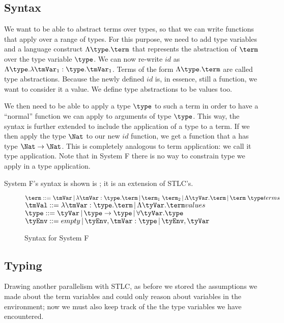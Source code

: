 \subsection{Syntax}
We want to be able to abstract terms over types, so that we can write functions that apply over a range of types. For this purpose, we need to add type variables and a language construct $\Lambda \type.\term$ that represents the abstraction of $\term$ over the type variable $\type$. We can now re-write $id$ as $\Lambda \type. \lambda \tmVar_1: \type . \tmVar_1$. Terms of the form $\Lambda \type.\term$ are called type abstractions. Because the newly defined $id$ is, in essence, still a function, we want to consider it a value. We define type abstractions to be values too.

We then need to be able to apply a type $\type$ to such a term in order to have a ``normal'' function we can apply to arguments of type $\type$. This way, the syntax is further extended to include the application of a type to a term. If we then apply the type $\Nat$ to our new $id$ function, we get a function that a has type $\Nat \rightarrow \Nat$. This is completely analogous to term application: we call it type application. Note that in System F there is no way to constrain type we apply in a type application.

System F's syntax is shown is ; it is an extension of STLC's.

\begin{figure}
    $\term ::= \tmVar\,|\,\lambda \tmVar:\type.\term\,|\,\term_1 \; \term_2 \,|\,\Lambda \tyVar .\term\,|\,\term\;\type \hfill terms $\\
  $\tmVal::= \lambda \tmVar:\type.\term \,|\, \Lambda \tyVar. \term\hfill values$\\
  $\type ::= \tyVar\,|\,\type \rightarrow \type \,|\,\forall \tyVar.\type$\\
  $\tyEnv::=  empty \,|\, \tyEnv, \tmVar:\type\,|\, \tyEnv,\tyVar$\\
  \caption{Syntax for System F}
  \label{sysfsyntax}
\end{figure}

\subsection{Typing}
Drawing another parallelism with STLC, as before we stored the assumptions we made about the term variables and could only reason about variables in the environment; now we must also keep track of the the type variables we have encountered.

